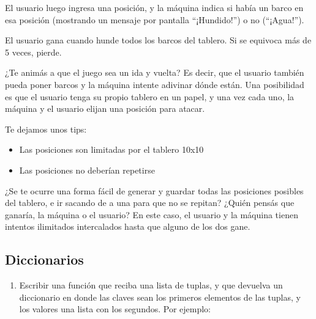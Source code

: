 \documentclass[
  letterpaper,
  DIV=11,
  numbers=noendperiod]{scrreprt}
\providecommand{\tightlist}{%
  \setlength{\itemsep}{0pt}\setlength{\parskip}{0pt}}\usepackage{longtable,booktabs,array}
\begin{document}
\begin{enumerate}
  El usuario luego ingresa una posición, y la máquina indica si había un
  barco en esa posición (mostrando un mensaje por pantalla
  ``¡Hundido!'') o no (``¡Agua!'').

  El usuario gana cuando hunde todos los barcos del tablero. Si se
  equivoca más de 5 veces, pierde.

  \begin{tcolorbox}[enhanced jigsaw, colframe=quarto-callout-important-color-frame, leftrule=.75mm, titlerule=0mm, left=2mm, bottomtitle=1mm, arc=.35mm, opacitybacktitle=0.6, toptitle=1mm, colbacktitle=quarto-callout-important-color!10!white, opacityback=0, breakable, title=\textcolor{quarto-callout-important-color}{\faExclamation}\hspace{0.5em}{Batalla Naval: Modo Supervivencia}, toprule=.15mm, rightrule=.15mm, colback=white, coltitle=black, bottomrule=.15mm]

  ¿Te animás a que el juego sea un ida y vuelta? Es decir, que el
  usuario también pueda poner barcos y la máquina intente adivinar dónde
  están. Una posibilidad es que el usuario tenga su propio tablero en un
  papel, y una vez cada uno, la máquina y el usuario elijan una posición
  para atacar.

  Te dejamos unos tips:

  \begin{itemize}
  \tightlist
  \item
    Las posiciones son limitadas por el tablero 10x10
  \item
    Las posiciones no deberían repetirse
  \end{itemize}

  ¿Se te ocurre una forma fácil de generar y guardar todas las
  posiciones posibles del tablero, e ir sacando de a una para que no se
  repitan? ¿Quién pensás que ganaría, la máquina o el usuario? En este
  caso, el usuario y la máquina tienen intentos ilimitados intercalados
  hasta que alguno de los dos gane.

  \end{tcolorbox}
\end{enumerate}

\subsection*{Diccionarios}\label{diccionarios-1}

\begin{enumerate}
\def\labelenumi{\arabic{enumi}.}
\tightlist
\item
  Escribir una función que reciba una lista de tuplas, y que devuelva un
  diccionario en donde las claves sean los primeros elementos de las
  tuplas, y los valores una lista con los segundos. Por ejemplo:
\end{enumerate}
\end{document}
